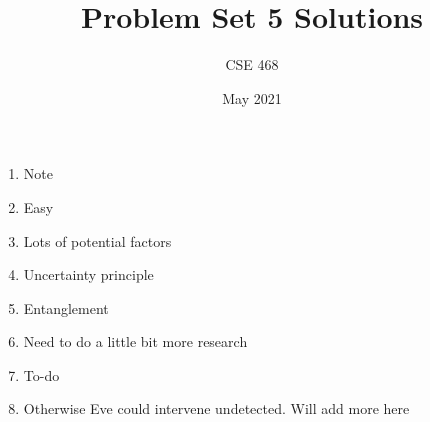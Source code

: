 \documentclass[12pt]{article}
\title{Problem Set 5 Solutions}
\author{CSE 468}
\date{May 2021}
\begin{document}
\maketitle

\begin{enumerate}[font=\bfseries]
    \item Note
    \item Easy
    \item Lots of potential factors
    \item Uncertainty principle
    \item Entanglement
    \item Need to do a little bit more research
    \item To-do
    \item Otherwise Eve could intervene undetected. Will add more here
\end{enumerate}
\end{document}
